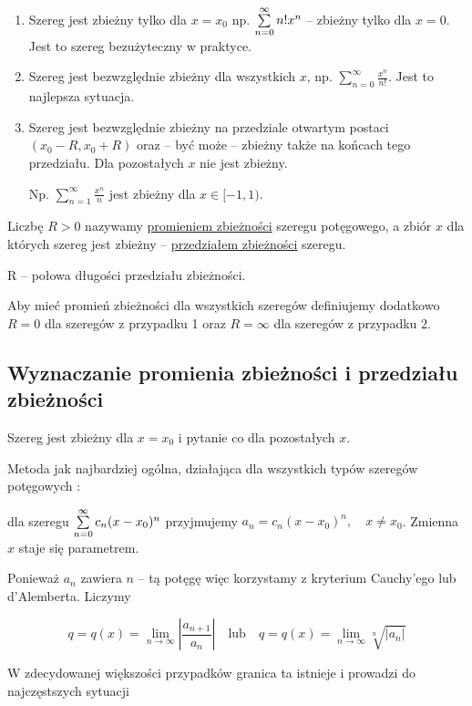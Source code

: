 \begin{enumerate}
    \item Szereg jest zbieżny tylko dla $x=x_0$ np. $ \sum\limits_{n = 0}^{\infty} n!x^n $ -- zbieżny tylko dla $x=0$.
    Jest to szereg bezużyteczny w praktyce.
    \item Szereg jest bezwzględnie zbieżny dla wszystkich $x$, np. $ \sum\limits_{n = 0}^{\infty} \frac{x^n}{n!} $.
    Jest to najlepsza sytuacja.
    \item Szereg jest bezwzględnie zbieżny na przedziale otwartym postaci $(x_0 - R, x_0 + R)$ oraz -- być może -- zbieżny
    także na końcach tego przedziału. Dla pozostałych $x$ nie jest zbieżny.

    Np. $ \sum\limits_{n=1}^{\infty} \frac{x^n}{n} $ jest zbieżny dla $x \in [-1, 1)$. \\
\end{enumerate}

Liczbę $R > 0$ nazywamy \underline{promieniem zbieżności} szeregu potęgowego, a zbiór $x$ dla których szereg
jest zbieżny -- \underline{przedziałem zbieżności} szeregu.

R -- połowa długości przedziału zbieżności.

Aby mieć promień zbieżności dla wszystkich szeregów definiujemy dodatkowo $R = 0$ dla szeregów z przypadku 1 oraz
$R = \infty$ dla szeregów z przypadku 2.


\subsection*{Wyznaczanie promienia zbieżności i przedziału zbieżności}

Szereg jest zbieżny dla $x = x_0$ i pytanie co dla pozostałych $x$.

Metoda jak najbardziej ogólna, działająca dla wszystkich typów szeregów potęgowych :

dla szeregu $ \sum\limits_{n = 0}^{\infty} c_n(x-x_0)^n $ przyjmujemy $ a_n = c_n(x - x_0)^n, \quad x \neq x_0 $.
Zmienna $x$ staje się parametrem.

Ponieważ $a_n$ zawiera $n$ -- tą potęgę więc korzystamy z kryterium Cauchy'ego lub d'Alemberta. Liczymy

$$ q = q(x) = \lim_{n \to \infty} \left| \frac{a_{n+1}}{a_n} \right| \quad \textrm{lub} \quad 
q = q(x) = \lim_{n \to \infty} \sqrt[n]{|a_n|} $$

W zdecydowanej większości przypadków granica ta istnieje i prowadzi do najczęstszych sytuacji

